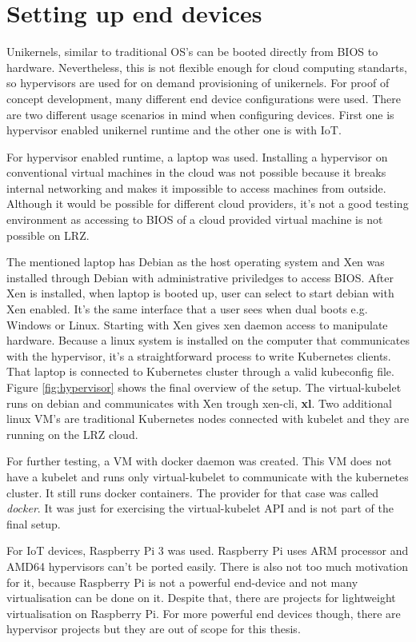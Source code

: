
\section{Setting up end devices}
Unikernels, similar to traditional OS's can be booted directly from BIOS to hardware. Nevertheless, this is not flexible enough for cloud computing standarts, so hypervisors are used for on demand provisioning of unikernels. For proof of concept development, many different end device configurations were used. There are two different usage scenarios in mind when configuring devices. First one is hypervisor enabled unikernel runtime and the other one is with IoT.

For hypervisor enabled runtime, a laptop was used. Installing a hypervisor on conventional virtual machines in the cloud was not possible because it breaks internal networking and makes it impossible to access machines from outside. Although it would be possible for different cloud providers, it's not a good testing environment as accessing to BIOS of a cloud provided virtual machine is not possible on LRZ.

The mentioned laptop has Debian as the host operating system and Xen was installed through Debian with administrative priviledges to access BIOS. After Xen is installed, when laptop is booted up, user can select to start debian with Xen enabled. It's the same interface that a user sees when dual boots e.g. Windows or Linux. Starting with Xen gives xen daemon access to manipulate hardware. Because a linux system is installed on the computer that communicates with the hypervisor, it's a straightforward process to write Kubernetes clients. That laptop is connected to Kubernetes cluster through a valid kubeconfig file. Figure \ref{fig:hypervisor} shows the final overview of the setup. The virtual-kubelet runs on debian and communicates with Xen trough xen-cli, \textbf{xl}. Two additional linux VM's are traditional Kubernetes nodes connected with kubelet and they are running on the LRZ cloud.

For further testing, a VM with docker daemon was created. This VM does not have a kubelet and runs only virtual-kubelet to communicate with the kubernetes cluster. It still runs docker containers. The provider for that case was called \textit{docker}. It was just for exercising the virtual-kubelet API and is not part of the final setup.

For IoT devices, Raspberry Pi 3 was used. Raspberry Pi uses ARM processor and AMD64 hypervisors can't be ported easily. There is also not too much motivation for it, because Raspberry Pi is not a powerful end-device and not many virtualisation can be done on it. Despite that, there are projects for lightweight virtualisation on Raspberry Pi. For more powerful end devices though, there are hypervisor projects but they are out of scope for this thesis.

